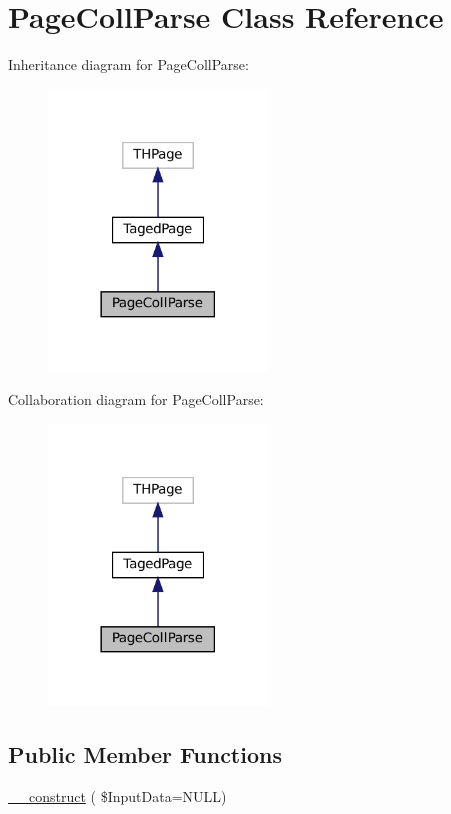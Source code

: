 \hypertarget{class_page_coll_parse}{}\section{Page\+Coll\+Parse Class Reference}
\label{class_page_coll_parse}


Inheritance diagram for Page\+Coll\+Parse\+:\nopagebreak
\begin{figure}[H]
\begin{center}
\leavevmode
\includegraphics[width=165pt]{class_page_coll_parse__inherit__graph}
\end{center}
\end{figure}


Collaboration diagram for Page\+Coll\+Parse\+:\nopagebreak
\begin{figure}[H]
\begin{center}
\leavevmode
\includegraphics[width=165pt]{class_page_coll_parse__coll__graph}
\end{center}
\end{figure}
\subsection*{Public Member Functions}
\begin{DoxyCompactItemize}
\item 
\hyperlink{class_page_coll_parse_a5a6465bed563b202301f5cbc6aff4d6b}{\+\_\+\+\_\+construct} ( \$Input\+Data=N\+U\+LL)
\end{DoxyCompactItemize}
